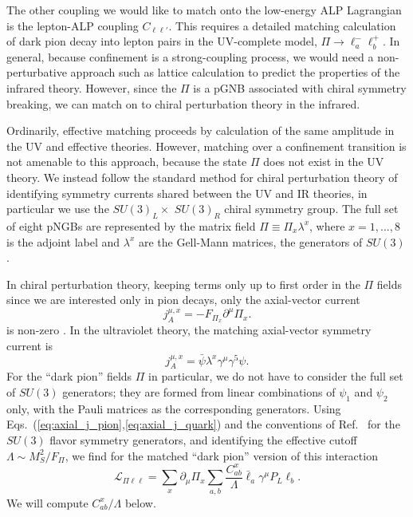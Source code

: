 The other coupling we would like to match onto the low-energy ALP Lagrangian is the lepton-ALP coupling $C_{\ell \ell'}$.  This requires a detailed matching calculation of dark pion decay into lepton pairs in the UV-complete model, $\Pi \rightarrow \ell_a^- \ell_b^+$.  In general, because confinement is a strong-coupling process, we would need a non-perturbative approach such as lattice calculation to predict the properties of the infrared theory.  However, since the $\Pi$ is a pGNB associated with chiral symmetry breaking, we can match on to chiral perturbation theory in the infrared. 

Ordinarily, effective matching proceeds by calculation of the same amplitude in the UV and effective theories.  However, matching over a confinement transition is not amenable to this approach, because the state $\Pi$ does not exist in the UV theory.  We instead follow the standard method for chiral perturbation theory of identifying symmetry currents shared between the UV and IR theories, in particular we use the $SU(3)_L \times$ $SU(3)_R$ chiral symmetry group.  The full set of eight pNGBs are represented by the matrix field $\Pi \equiv \Pi_x \lambda^x$, where $x = 1,...,8$ is the adjoint label and $\lambda^x$ are the Gell-Mann matrices, the generators of $SU(3)$.

In chiral perturbation theory, keeping terms only up to first order in the $\Pi$ fields since we are interested only in pion decays, only the axial-vector current 
%
\begin{equation} \label{eq:axial_j_pion}
j_A^{\mu,x} = -F_{\Pi_x} \partial^\mu \Pi_x.
\end{equation}
is non-zero \cite{Scherer:2005ri}. In the ultraviolet theory, the matching axial-vector symmetry current is
\begin{equation} \label{eq:axial_j_quark}
j_A^{\mu,x} = \bar{\psi} \lambda^x \gamma^\mu \gamma^5 \psi.
\end{equation}
For the ``dark pion'' fields $\Pi$ in particular, we do not have to consider the full set of $SU(3)$ generators; they are formed from linear combinations of $\psi_1$ and $\psi_2$ only, with the Pauli matrices as the corresponding generators. Using Eqs.~(\ref{eq:axial_j_pion},\ref{eq:axial_j_quark}) and the conventions of Ref.~\cite{Scherer:2005ri} for the $SU(3)$ flavor symmetry generators, and identifying the effective cutoff $\Lambda \sim M_S^2/F_\Pi$, we find for the matched ``dark pion'' version of this interaction
\begin{equation}
    \mathcal{L}_{\Pi\ell\ell} = \sum_{x} \partial_\mu \Pi_x\sum_{a,b}\frac{C_{ab}^x}{\Lambda}\bar{\ell}_a\gamma^\mu P_L\ell_b.
\end{equation}
We will compute $C_{ab}^x/\Lambda$ below.
%

